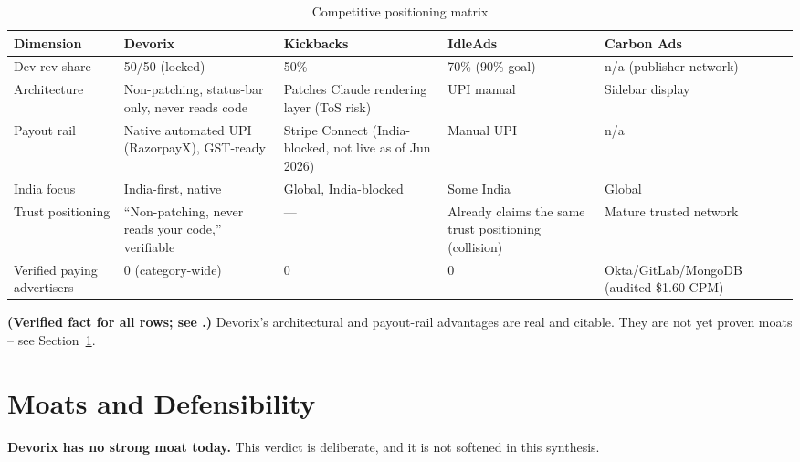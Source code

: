 \begin{table}[htbp]
\centering
\caption{Competitive positioning matrix}
\label{tab:competitive-positioning}
\begin{tabular}{@{}p{2.6cm}p{2.6cm}p{2.6cm}p{2.6cm}p{2.8cm}@{}}
\toprule
\textbf{Dimension} & \textbf{Devorix} & \textbf{Kickbacks} & \textbf{IdleAds} & \textbf{Carbon Ads} \\
\midrule
Dev rev-share & 50/50 (locked) & 50\% & 70\% (90\% goal) & n/a (publisher network) \\
Architecture & Non-patching, status-bar only, never reads code & Patches Claude rendering layer (ToS risk) & UPI manual & Sidebar display \\
Payout rail & Native automated UPI (RazorpayX), GST-ready & Stripe Connect (India-blocked, not live as of Jun 2026) & Manual UPI & n/a \\
India focus & India-first, native & Global, India-blocked & Some India & Global \\
Trust positioning & ``Non-patching, never reads your code,'' verifiable & --- & Already claims the same trust positioning (collision) & Mature trusted network \\
Verified paying advertisers & 0 (category-wide) & 0 & 0 & Okta/GitLab/MongoDB (audited \$1.60 CPM) \\
\bottomrule
\end{tabular}
\end{table}

\textbf{(Verified fact for all rows; see \cite{kickbacks_2026, idleads_2026, pragmaticengineer_carbonads_2024}.)} Devorix's architectural and payout-rail advantages are real and citable. They are not yet proven moats -- see Section~\ref{sec:moats}.

\section{Moats and Defensibility}
\label{sec:moats}

\textbf{Devorix has no strong moat today.} This verdict is deliberate, and it is not softened in this synthesis.


